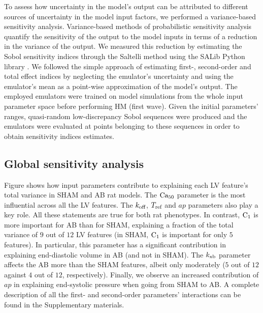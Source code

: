 \vspace{0.2cm}
To assess how uncertainty in the model's output can be attributed to different sources of uncertainty in the model input factors, we performed a variance-based sensitivity analysis. Variance-based methods of probabilistic sensitivity analysis quantify the sensitivity of the output to the model inputs in terms of a reduction in the variance of the output. We measured this reduction by estimating the Sobol sensitivity indices \cite{Sobol:2001} through the Saltelli method \cite{Saltelli:2010} using the SALib Python library \cite{Herman:2017}. We followed the simple approach of estimating first-, second-order and total effect indices by neglecting the emulator's uncertainty and using the emulator's mean as a point-wise approximation of the model's output. The employed emulators were trained on model simulations from the whole input parameter space before performing HM (first wave). Given the initial parameters' ranges, quasi-random low-discrepancy Sobol sequences were produced and the emulators were evaluated at points belonging to these sequences in order to obtain sensitivity indices estimates.


%
%
%
\subsection{Global sensitivity analysis}
Figure shows how input parameters contribute to explaining each LV feature's total variance in SHAM and AB rat models. The $\textrm{Ca}_{50}$ parameter is the most influential across all the LV features. The $k_{\textrm{off}}$, $T_{\textrm{ref}}$ and $ap$ parameters also play a key role. All these statements are true for both rat phenotypes. In contrast, $\textrm{C}_1$ is more important for AB than for SHAM, explaining a fraction of the total variance of $9$ out of $12$ LV features (in SHAM, $\textrm{C}_1$ is important for only $5$ features). In particular, this parameter has a significant contribution in explaining end-diastolic volume in AB (and not in SHAM). The $k_{\textrm{xb}}$ parameter affects the AB more than the SHAM features, albeit only moderately ($5$ out of $12$ against $4$ out of $12$, respectively). Finally, we observe an increased contribution of $ap$ in explaining end-systolic pressure when going from SHAM to AB. A complete description of all the first- and second-order parameters' interactions can be found in the Supplementary materials.

